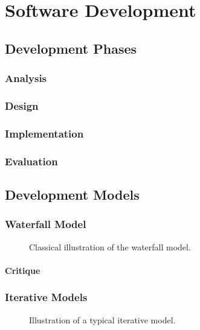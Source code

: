 \chapter{Software Development}

\section{Development Phases}
\subsection{Analysis}
\subsection{Design}
\subsection{Implementation}
\subsection{Evaluation}

\section{Development Models}
\subsection{Waterfall Model}

\begin{figure}[tbp]
  
  \caption{Classical illustration of the waterfall model.}
  \label{fig:swdev:waterfall}
\end{figure}

\subsubsection{Critique}

\subsection{Iterative Models}


\begin{figure}[tbp]
  
  \caption{Illustration of a typical iterative model.}
  \label{fig:swdev:waterfall}
\end{figure}

